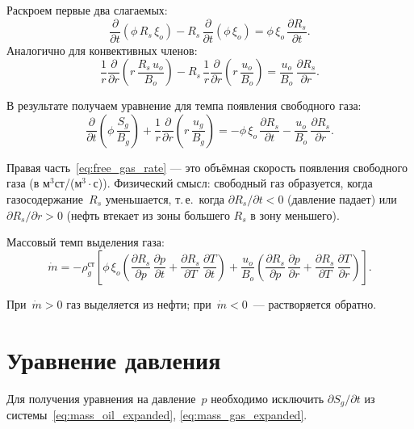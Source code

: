 \documentclass[12pt,a4paper]{article}
\begin{document}
Раскроем первые два слагаемых:
\[
  \frac{\partial}{\partial t}\!\left(\phi\,R_s\,\xi_o\right)
  - R_s\,\frac{\partial}{\partial t}\!\left(\phi\,\xi_o\right)
  = \phi\,\xi_o\,\frac{\partial R_s}{\partial t}.
\]
Аналогично для конвективных членов:
\[
  \frac{1}{r}\frac{\partial}{\partial r}\!\left(r\,\frac{R_s\,u_o}{B_o}\right)
  - R_s\,\frac{1}{r}\frac{\partial}{\partial r}\!
    \left(r\,\frac{u_o}{B_o}\right)
  = \frac{u_o}{B_o}\,\frac{\partial R_s}{\partial r}.
\]

В результате получаем уравнение для темпа появления свободного газа:
\begin{equation}\label{eq:free_gas_rate}
  \boxed{
    \frac{\partial}{\partial t}\!\left(\phi\,\frac{S_g}{B_g}\right)
    + \frac{1}{r}\frac{\partial}{\partial r}\!
      \left(r\,\frac{u_g}{B_g}\right)
    = -\phi\,\xi_o\,\frac{\partial R_s}{\partial t}
      - \frac{u_o}{B_o}\,\frac{\partial R_s}{\partial r}.
  }
\end{equation}

Правая часть~\eqref{eq:free_gas_rate} --- это объёмная скорость
появления свободного газа (в м$^3$ст/(м$^3\cdot$с)).
Физический смысл: свободный газ образуется, когда газосодержание~$R_s$
уменьшается, т.\,е.\ когда $\partial R_s/\partial t < 0$ (давление
падает) или $\partial R_s/\partial r > 0$ (нефть втекает из зоны
большего $R_s$ в зону меньшего).

Массовый темп выделения газа:
\begin{equation}\label{eq:mdot}
  \dot{m} = -\rho_g^{\text{ст}}\!\left[
    \phi\,\xi_o\!\left(
      \frac{\partial R_s}{\partial p}\,\frac{\partial p}{\partial t}
      + \frac{\partial R_s}{\partial T}\,\frac{\partial T}{\partial t}
    \right)
    + \frac{u_o}{B_o}\!\left(
      \frac{\partial R_s}{\partial p}\,\frac{\partial p}{\partial r}
      + \frac{\partial R_s}{\partial T}\,\frac{\partial T}{\partial r}
    \right)
  \right].
\end{equation}

При~$\dot{m} > 0$ газ выделяется из нефти; при~$\dot{m} < 0$~---
растворяется обратно.


\section{Уравнение давления}\label{sec:pressure}

Для получения уравнения на давление~$p$ необходимо исключить
$\partial S_g/\partial t$ из системы~\eqref{eq:mass_oil_expanded},
\eqref{eq:mass_gas_expanded}.
\end{document}
